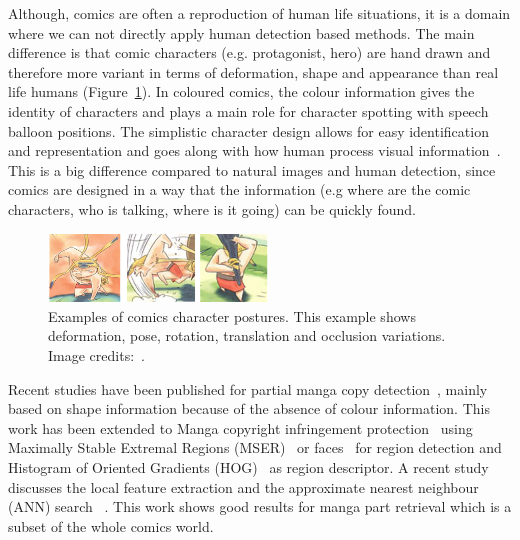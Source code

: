 Although, comics are often a reproduction of human life situations, it is a domain where we can not directly apply human detection based methods.
The main difference is that comic characters (e.g. protagonist, hero) are hand drawn and therefore more variant in terms of deformation, shape and appearance than real life humans (Figure~\ref{fig:sota:tarzan}).
In coloured comics, the colour information gives the identity of characters and plays a main role for character spotting with speech balloon positions. 
The simplistic character design allows for easy identification and representation and goes along with how human process visual information~\cite{ahmadimpactsOfManga,medley2010discerningPictures,cohn2010limits}.
This is a big difference compared to natural images and human detection, since comics are designed in a way that the information (e.g where are the comic characters, who is talking, where is it going) can be quickly found.%

 \begin{figure}[!ht]	%
 	 \centering
 	\includegraphics[width=220px]{prunelle.png}
 	\caption[Illustration of the diversity of comics character postures]{Examples of comics character postures. This example shows deformation, pose, rotation, translation and occlusion variations. Image credits:~\cite{Prunelle10}.
}
 	\label{fig:sota:tarzan}
 \end{figure}

Recent studies have been published for partial manga copy detection~\cite{Sun2010}, mainly based on shape information because of the absence of colour information.
This work has been extended to Manga copyright infringement protection~\cite{Sun2009Detecting,Sun2013IJDAR} using Maximally Stable Extremal Regions (MSER)~\cite{matas2004robust} or faces~\cite{Viola2004robust} for region detection and Histogram of Oriented Gradients (HOG)~\cite{Dalal05} as region descriptor.
A recent study discusses the local feature extraction and the approximate nearest neighbour (ANN) search~\cite{Iwata2014StudyManga} .
This work shows good results for manga part retrieval which is a subset of the whole comics world.


